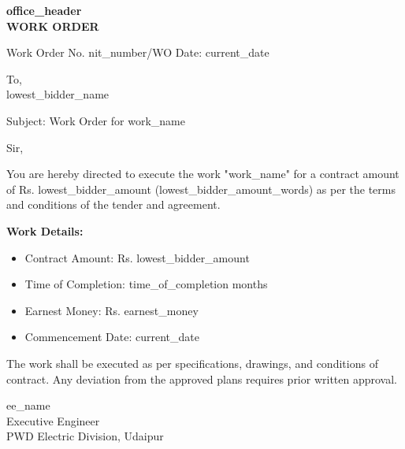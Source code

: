 \documentclass[12pt,a4paper]{article}
\begin{document}
\begin{center}
\textbf{{{office_header}}}\\[0.3cm]
\textbf{WORK ORDER}\\[0.2cm]
\end{center}

\vspace{0.5cm}

\noindent
Work Order No. {{nit_number}}/WO \hfill Date: {{current_date}}

\vspace{0.5cm}

\noindent
To,\\
{{lowest_bidder_name}}

\vspace{0.3cm}

\noindent
Subject: Work Order for {{work_name}}

\vspace{0.3cm}

\noindent
Sir,

\vspace{0.3cm}

\noindent
You are hereby directed to execute the work "{{work_name}}" for a contract amount of Rs. {{lowest_bidder_amount}} ({{lowest_bidder_amount_words}}) as per the terms and conditions of the tender and agreement.

\vspace{0.3cm}

\noindent
\textbf{Work Details:}
\begin{itemize}
\item Contract Amount: Rs. {{lowest_bidder_amount}}
\item Time of Completion: {{time_of_completion}} months
\item Earnest Money: Rs. {{earnest_money}}
\item Commencement Date: {{current_date}}
\end{itemize}

\vspace{0.3cm}

\noindent
The work shall be executed as per specifications, drawings, and conditions of contract. Any deviation from the approved plans requires prior written approval.

\vspace{1cm}

\noindent
\hfill {{ee_name}}\\
\hfill Executive Engineer\\
\hfill PWD Electric Division, Udaipur
\end{document}
